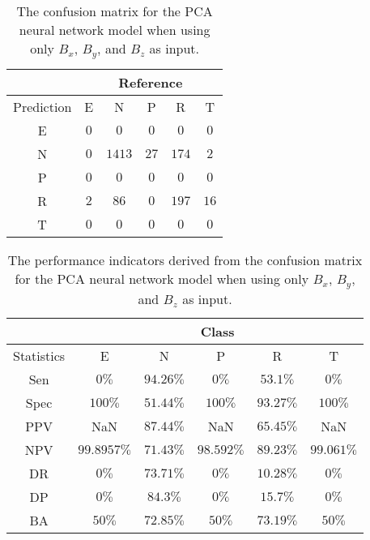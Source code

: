 \begin{table}[!ht]
	\centering
	\begin{tabular}{|c|c|c|c|c|c|}
		\hline
		 & \multicolumn{5}{|c|}{Reference} \\ \hline
		 Prediction & E & N & P & R & T \\ \hline
		 E & $0$ & $0$ & $0$ & $0$ & $0$ \\ \hline
		 N & $0$ & $1413$ & $27$ & $174$ & $2$ \\ \hline
		 P & $0$ & $0$ & $0$ & $0$ & $0$ \\ \hline
		 R & $2$ & $86$ & $0$ & $197$ & $16$ \\ \hline
		 T & $0$ & $0$ & $0$ & $0$ & $0$ \\ \hline
	\end{tabular}
	\caption{The confusion matrix for the PCA neural network model when using only $B_{x}$, $B_{y}$, and $B_{z}$ as input.}
	\label{tab:cm:coord:pcaNNet}
\end{table}

\begin{table}[!ht]
	\centering
	\begin{tabular}{|c|c|c|c|c|c|}
		\hline
		 & \multicolumn{5}{c|}{Class} \\ \hline
		Statistics & E & N & P & R & T \\ \hline
		Sen & $0\%$ & $94.26\%$ & $0\%$ & $53.1\%$ & $0\%$ \\ \hline
		Spec & $100\%$ & $51.44\%$ & $100\%$ & $93.27\%$ & $100\%$ \\ \hline
		PPV & NaN & $87.44\%$ & NaN & $65.45\%$ & NaN \\ \hline
		NPV & $99.8957\%$ & $71.43\%$ & $98.592\%$ & $89.23\%$ & $99.061\%$ \\ \hline
		DR & $0\%$ & $73.71\%$ & $0\%$ & $10.28\%$ & $0\%$ \\ \hline
		DP & $0\%$ & $84.3\%$ & $0\%$ & $15.7\%$ & $0\%$ \\ \hline
		BA & $50\%$ & $72.85\%$ & $50\%$ & $73.19\%$ & $50\%$ \\ \hline
	\end{tabular}
	\caption{The performance indicators derived from the confusion matrix for the PCA neural network model when using only $B_{x}$, $B_{y}$, and $B_{z}$ as input.}
	\label{tab:cs:reverse:coord:pcaNNet}
\end{table}

